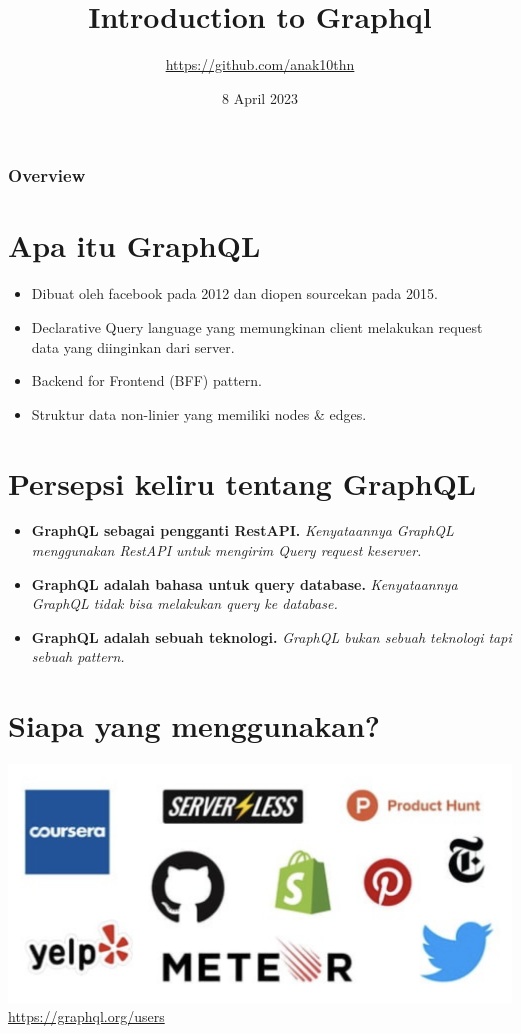 \documentclass[12pt,xcolor=table]{beamer}
\title{Introduction to Graphql}
\subtitle{\url{https://github.com/anak10thn}}
\date{8 April 2023}
\begin{document}
\maketitle

\begin{frame}
\frametitle{Overview}
\tableofcontents
\end{frame}

\section{Apa itu GraphQL}

\begin{frame}
\begin{itemize}
    \item Dibuat oleh facebook pada 2012 dan diopen sourcekan pada 2015.
    \item Declarative Query language yang memungkinan client melakukan request data yang diinginkan dari server.
    \item Backend for Frontend (BFF) pattern.
    \item Struktur data non-linier yang memiliki nodes \& edges.
\end{itemize}
\end{frame}

\section{Persepsi keliru tentang GraphQL}

\begin{frame}
\begin{itemize}
    \item \textbf{GraphQL sebagai pengganti RestAPI.} \textit{Kenyataannya GraphQL menggunakan RestAPI untuk mengirim Query request keserver.}
    \item \textbf{GraphQL adalah bahasa untuk query database.} \textit{Kenyataannya GraphQL tidak bisa melakukan query ke database.}
    \item \textbf{GraphQL adalah sebuah teknologi.} \textit{GraphQL bukan sebuah teknologi tapi sebuah pattern.}
\end{itemize}
\end{frame}

\section{Siapa yang menggunakan?}
\begin{frame}
\includegraphics[scale=0.3]{images/who-use-it.png}
\url{https://graphql.org/users}
\end{frame}
\end{document}

